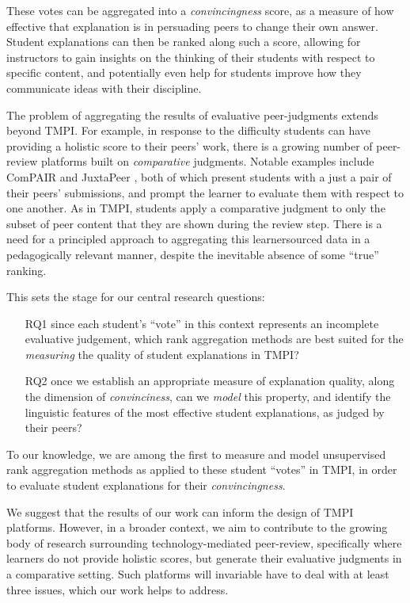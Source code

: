\documentclass[notitlepage,12pt]{jedm}
\begin{document}
These votes can be aggregated into a \textit{convincingness} score, as a 
measure of how effective that explanation is in persuading peers to change 
their own answer.
Student explanations can then be ranked along such a score, allowing for 
instructors to gain insights on the thinking of their students with respect to 
specific content, and potentially even help for students improve how they 
communicate ideas with their discipline.

The problem of aggregating the results of evaluative peer-judgments extends  
beyond TMPI.
For example, in response to the difficulty students can have providing a 
holistic score to their peers' work, there is a growing number of peer-review 
platforms built on \textit{comparative} judgments.
Notable examples include ComPAIR \cite{potter_compair:_2017} and 
JuxtaPeer \cite{cambre_juxtapeer:_2018}, both of which present students with a 
just a pair of their peers' submissions, and prompt the learner to evaluate 
them with respect to one another.
As in TMPI, students apply a comparative judgment to only the subset of peer 
content that they are shown during the review step.
There is a need for a principled approach to aggregating this learnersourced 
data in a pedagogically relevant manner, despite the inevitable absence of some 
``true'' ranking.

This sets the stage for our central research questions: 
\begin{itemize}
	\item[RQ1] since each student's ``vote'' in this context represents an 
	incomplete evaluative judgement, which rank aggregation 
	methods are best suited for the \textit{measuring} the quality of student 
	explanations in TMPI?
	\item[RQ2] once we establish an appropriate measure of explanation quality, 
	along the dimension of \textit{convinciness}, can we \textit{model} this 
	property, and identify the linguistic features of the 
	most effective student explanations, as judged by their peers?
\end{itemize}

To our knowledge, we are among the first to measure and model unsupervised rank 
aggregation methods as applied to these student ``votes'' in TMPI, in order to 
evaluate student explanations for their \textit{convincingness}. 

We suggest that the results of our work can inform the design of TMPI platforms.
However, in a broader context, we aim to contribute to the growing body of 
research surrounding technology-mediated peer-review, specifically where 
learners do not provide holistic scores, but generate their evaluative 
judgments in a comparative setting. 
Such platforms will invariable have to deal with at least three issues, which 
our work helps to address.
\end{document}

